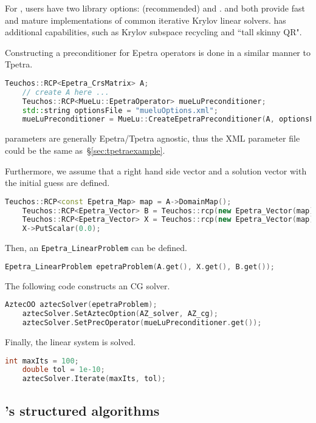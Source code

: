 For \epetra, users have two library options: \belos{} (recommended) and \aztecoo{}.
\aztecoo{} and \belos both provide fast and mature implementations of common iterative Krylov linear solvers.
\belos has additional capabilities, such as Krylov subspace recycling and ``tall skinny QR".

Constructing a \muelu{} preconditioner for Epetra operators is done in a similar
manner to Tpetra.
\begin{lstlisting}[language=C++]
    Teuchos::RCP<Epetra_CrsMatrix> A;
    // create A here ...
    Teuchos::RCP<MueLu::EpetraOperator> mueLuPreconditioner;
    std::string optionsFile = "mueluOptions.xml";
    mueLuPreconditioner = MueLu::CreateEpetraPreconditioner(A, optionsFile);
\end{lstlisting}
\muelu{} parameters are generally Epetra/Tpetra agnostic, thus the XML parameter file
could be the same as~\S\ref{sec:tpetraexample}.

Furthermore, we assume that a right hand side vector and a solution vector with
the initial guess are defined.
\begin{lstlisting}[language=C++]
    Teuchos::RCP<const Epetra_Map> map = A->DomainMap();
    Teuchos::RCP<Epetra_Vector> B = Teuchos::rcp(new Epetra_Vector(map));
    Teuchos::RCP<Epetra_Vector> X = Teuchos::rcp(new Epetra_Vector(map));
    X->PutScalar(0.0);
\end{lstlisting}

Then, an \texttt{Epetra\_LinearProblem} can be defined.
\begin{lstlisting}[language=C++]
    Epetra_LinearProblem epetraProblem(A.get(), X.get(), B.get());
\end{lstlisting}

The following code constructs an \aztecoo{} CG solver.
\begin{lstlisting}[language=C++]
    AztecOO aztecSolver(epetraProblem);
    aztecSolver.SetAztecOption(AZ_solver, AZ_cg);
    aztecSolver.SetPrecOperator(mueLuPreconditioner.get());
\end{lstlisting}

Finally, the linear system is solved.
\begin{lstlisting}[language=C++]
    int maxIts = 100;
    double tol = 1e-10;
    aztecSolver.Iterate(maxIts, tol);
\end{lstlisting}


\subsection{\muelu's structured algorithms}

